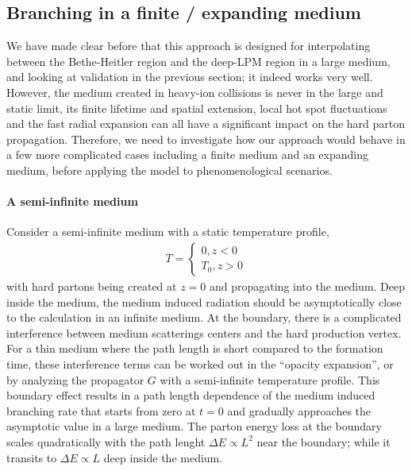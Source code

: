 \subsection{Branching in a finite / expanding medium}
We have made clear before that this approach is designed for interpolating between the Bethe-Heitler region and the deep-LPM region in a large medium, and looking at validation in the previous section; it indeed works very well.
However, the medium created in heavy-ion collisions is never in the large and static limit, its finite lifetime and spatial extension, local hot spot fluctuations and the fast radial expansion can all have a significant impact on the hard parton propagation. 
Therefore, we need to investigate how our approach would behave in a few more complicated cases including a finite medium and an expanding medium, before applying the model to phenomenological scenarios.

\paragraph{A semi-infinite medium}
Consider a semi-infinite medium with a static temperature profile,
\begin{eqnarray}
T = \begin{cases}
0 , z<0\\
T_0, z>0
\end{cases}
\end{eqnarray}
with hard partons being created at $z=0$ and propagating into the medium.
Deep inside the medium, the medium induced radiation should be asymptotically close to the calculation in an infinite medium.
At the boundary, there is a complicated interference between medium scatterings centers and the hard production vertex.
For a thin medium where the path length is short compared to the formation time, these interference terms can be worked out in the ``opacity expansion'', or by analyzing the propagator $G$ with a semi-infinite temperature profile.
This boundary effect results in a path length dependence of the medium induced branching rate that starts from zero at $t=0$ and gradually approaches the asymptotic value in a large medium.
The parton energy loss at the boundary scales quadratically with the path lenght  $\Delta E \propto L^2$ near the boundary; while it transits to $\Delta E \propto L$ deep inside the medium.

